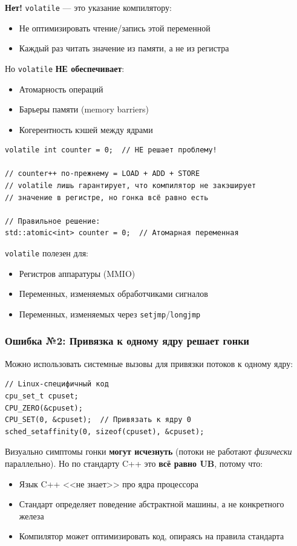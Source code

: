 \documentclass[a4paper,12pt]{article}
\begin{document}
\textbf{Нет!} \texttt{volatile} --- это указание компилятору:
\begin{itemize}
    \item Не оптимизировать чтение/запись этой переменной
    \item Каждый раз читать значение из памяти, а не из регистра
\end{itemize}

Но \texttt{volatile} \textbf{НЕ обеспечивает}:
\begin{itemize}
    \item Атомарность операций
    \item Барьеры памяти (memory barriers)
    \item Когерентность кэшей между ядрами
\end{itemize}

\begin{lstlisting}
volatile int counter = 0;  // НЕ решает проблему!

// counter++ по-прежнему = LOAD + ADD + STORE
// volatile лишь гарантирует, что компилятор не закэширует
// значение в регистре, но гонка всё равно есть

// Правильное решение:
std::atomic<int> counter = 0;  // Атомарная переменная
\end{lstlisting}

\texttt{volatile} полезен для:
\begin{itemize}
    \item Регистров аппаратуры (MMIO)
    \item Переменных, изменяемых обработчиками сигналов
    \item Переменных, изменяемых через \texttt{setjmp}/\texttt{longjmp}
\end{itemize}

\subsubsection{Ошибка №2: Привязка к одному ядру решает гонки}

Можно использовать системные вызовы для привязки потоков к одному ядру:

\begin{lstlisting}
// Linux-специфичный код
cpu_set_t cpuset;
CPU_ZERO(&cpuset);
CPU_SET(0, &cpuset);  // Привязать к ядру 0
sched_setaffinity(0, sizeof(cpuset), &cpuset);
\end{lstlisting}

Визуально симптомы гонки \textbf{могут исчезнуть} (потоки не работают
\textit{физически} параллельно). Но по стандарту C++ это \textbf{всё равно UB},
потому что:
\begin{itemize}
    \item Язык C++ <<не знает>> про ядра процессора
    \item Стандарт определяет поведение абстрактной машины, а не конкретного железа
    \item Компилятор может оптимизировать код, опираясь на правила стандарта
\end{itemize}
\end{document}
